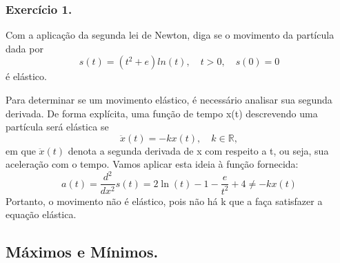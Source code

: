\subsubsection{Exerc\'icio 1.}
Com a aplica\c c\~ao da segunda lei de Newton, diga se o movimento da part\'icula
dada por
\[
	s(t) = (t^{2}+ e)ln(t), \quad t>0, \quad s(0) = 0
\]
\'e el\'astico.
\begin{proof*}
	Para determinar se um movimento el\'astico, \'e necess\'ario analisar sua segunda
	derivada. De forma expl\'icita, uma fun\c c\~ao de tempo x(t) descrevendo uma part\'icula
	ser\'a el\'astica se
	\[
		\ddot{x}(t) = -kx(t), \quad k\in\mathbb{R},
	\]
	em que $\ddot{x}(t)$ denota a segunda derivada de x com respeito a t, ou seja,
	sua acelera\c c\~ao com o tempo. Vamos aplicar esta ideia \`a fun\c c\~ao fornecida:
	\[
		a(t) = \frac{d^{2}}{dx^{2}}s(t) = 2\ln (t) -1 - \frac{e}{t^{2}}+ 4 \neq -kx(t)
	\]
	Portanto, o movimento n\~ao \'e el\'astico, pois n\~ao h\'a k que a fa\c ca
	satisfazer a equa\c c\~ao el\'astica. \qedsymbol
\end{proof*}

\subsection{M\'aximos e M\'inimos.}
